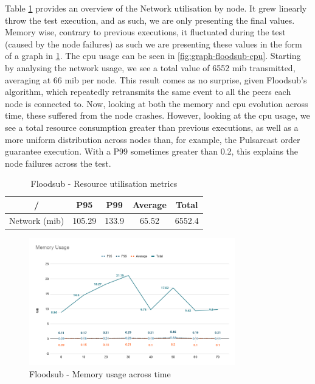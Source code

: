 Table \ref{table:floodsub} provides an overview of the Network utilisation by
node. It grew linearly throw the test execution, and as such, we are only
presenting the final values. Memory wise, contrary to previous executions, it
fluctuated during the test (caused by the node failures) as such we are
presenting these values in the form of a graph in
\ref{fig:graph-floodsub-memory}. The \acrshort{cpu} usage can be seen in
\ref{fig:graph-floodsub-cpu}. Starting by analysing the network usage, we see a
total value of 6552 \acrshort{mib} transmitted, averaging at 66 \acrshort{mib} per node. This result
comes as no surprise, given Floodsub's algorithm, which repeatedly retransmits
the same event to all the peers each node is connected to. Now, looking at both
the memory and \acrshort{cpu} evolution across time, these suffered from the node crashes.
However, looking at the \acrshort{cpu} usage, we see a total resource consumption greater
than previous executions, as well as a more uniform distribution across nodes
than, for example, the Pulsarcast order guarantee execution. With a P99
sometimes greater than 0.2, this explains the node failures across the test.

\begin{table}[!htb]
\caption{Floodsub - Resource utilisation metrics}
\label{table:floodsub}
  \begin{center}
   \begin{tabular}{|c| c c c c|} 
   \hline
   / & P95 & P99 & Average & Total \\ [0.5ex] 
   \hline\hline
   Network (\acrshort{mib}) & 105.29 & 133.9 & 65.52 & 6552.4 \\
   \hline
  \end{tabular}
  \end{center}
\end{table}

\begin{figure}[!htb]
  \centering
  \includegraphics[width=0.8\textwidth]{img/graph-floodsub-memory.png}
  \caption{Floodsub - Memory usage across time}
  \label{fig:graph-floodsub-memory}
\end{figure}

